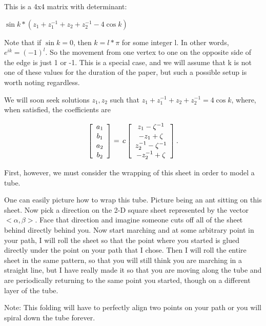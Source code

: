 \documentclass[12pt]{article}
\begin{document}
This is a 4x4 matrix with determinant: 


$ \sin{k} * (z_1 + z_1^{-1} + z_2 + z_2^{-1}-4 \cos{k})$ 

Note that if $ \sin{k} = 0$, then $k = l*\pi$ for some integer l. In other words, $e^{ik} = (-1)^l$. So the movement from one vertex to one on the opposite side of the edge is just 1 or -1. This is a special case, and we will assume that k is not one of these values for the duration of the paper, but such a possible setup is worth noting regardless.

We will soon seek solutions ${z_1, z_2}$ such that $z_1 + z_1^{-1} + z_2 + z_2^{-1}= 4 \cos{k}$, where, when satisfied, the coefficients are 

\begin{equation}\label{coefficients}
  \renewcommand{\arraystretch}{1.1}
\left[
  \begin{array}{c}
      a_1 \\ b_1 \\ a_2 \\ b_2
  \end{array}
\right]
=\,
c \left[
  \begin{array}{c}
      z_1-\zeta^{-1} \\ -z_1 + \zeta \\ z_2^{-1} - \zeta^{-1} \\ -z_2^{-1} + \zeta
  \end{array}
\right].
\end{equation}

First, however, we must consider the wrapping of this sheet in order to model a tube.

One can easily picture how to wrap this tube. Picture being an ant sitting on this sheet. Now pick a direction on the 2-D square sheet represented by the vector $<\alpha, \beta>$. Face that direction and imagine someone cuts off all of the sheet behind directly behind you. Now start marching and at some arbitrary point in your path, I will roll the sheet so that the point where you started is glued directly under the point on your path that I chose. Then I will roll the entire sheet in the same pattern, so that you will still think you are marching in a straight line, but I have really made it so that you are moving along the tube and are periodically returning to the same point you started, though on a different layer of the tube. 

Note: This folding will have to perfectly align two points on your path or you will spiral down the tube forever. 
\end{document}
